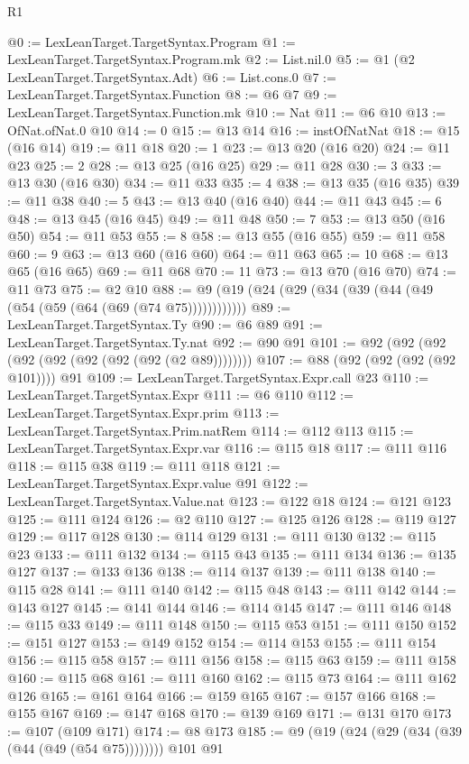 \begin{lexlean}{R1}
\begin{coremodule}
@0 := LexLeanTarget.TargetSyntax.Program
@1 := LexLeanTarget.TargetSyntax.Program.mk
@2 := List.nil.{0}
@5 := @1 (@2 LexLeanTarget.TargetSyntax.Adt)
@6 := List.cons.{0}
@7 := LexLeanTarget.TargetSyntax.Function
@8 := @6 @7
@9 := LexLeanTarget.TargetSyntax.Function.mk
@10 := Nat
@11 := @6 @10
@13 := OfNat.ofNat.{0} @10
@14 := 0
@15 := @13 @14
@16 := instOfNatNat
@18 := @15 (@16 @14)
@19 := @11 @18
@20 := 1
@23 := @13 @20 (@16 @20)
@24 := @11 @23
@25 := 2
@28 := @13 @25 (@16 @25)
@29 := @11 @28
@30 := 3
@33 := @13 @30 (@16 @30)
@34 := @11 @33
@35 := 4
@38 := @13 @35 (@16 @35)
@39 := @11 @38
@40 := 5
@43 := @13 @40 (@16 @40)
@44 := @11 @43
@45 := 6
@48 := @13 @45 (@16 @45)
@49 := @11 @48
@50 := 7
@53 := @13 @50 (@16 @50)
@54 := @11 @53
@55 := 8
@58 := @13 @55 (@16 @55)
@59 := @11 @58
@60 := 9
@63 := @13 @60 (@16 @60)
@64 := @11 @63
@65 := 10
@68 := @13 @65 (@16 @65)
@69 := @11 @68
@70 := 11
@73 := @13 @70 (@16 @70)
@74 := @11 @73
@75 := @2 @10
@88 := @9 (@19 (@24 (@29 (@34 (@39 (@44 (@49 (@54 (@59 (@64 (@69 (@74 @75))))))))))))
@89 := LexLeanTarget.TargetSyntax.Ty
@90 := @6 @89
@91 := LexLeanTarget.TargetSyntax.Ty.nat
@92 := @90 @91
@101 := @92 (@92 (@92 (@92 (@92 (@92 (@92 (@92 (@2 @89))))))))
@107 := @88 (@92 (@92 (@92 (@92 @101)))) @91
@109 := LexLeanTarget.TargetSyntax.Expr.call @23
@110 := LexLeanTarget.TargetSyntax.Expr
@111 := @6 @110
@112 := LexLeanTarget.TargetSyntax.Expr.prim
@113 := LexLeanTarget.TargetSyntax.Prim.natRem
@114 := @112 @113
@115 := LexLeanTarget.TargetSyntax.Expr.var
@116 := @115 @18
@117 := @111 @116
@118 := @115 @38
@119 := @111 @118
@121 := LexLeanTarget.TargetSyntax.Expr.value @91
@122 := LexLeanTarget.TargetSyntax.Value.nat
@123 := @122 @18
@124 := @121 @123
@125 := @111 @124
@126 := @2 @110
@127 := @125 @126
@128 := @119 @127
@129 := @117 @128
@130 := @114 @129
@131 := @111 @130
@132 := @115 @23
@133 := @111 @132
@134 := @115 @43
@135 := @111 @134
@136 := @135 @127
@137 := @133 @136
@138 := @114 @137
@139 := @111 @138
@140 := @115 @28
@141 := @111 @140
@142 := @115 @48
@143 := @111 @142
@144 := @143 @127
@145 := @141 @144
@146 := @114 @145
@147 := @111 @146
@148 := @115 @33
@149 := @111 @148
@150 := @115 @53
@151 := @111 @150
@152 := @151 @127
@153 := @149 @152
@154 := @114 @153
@155 := @111 @154
@156 := @115 @58
@157 := @111 @156
@158 := @115 @63
@159 := @111 @158
@160 := @115 @68
@161 := @111 @160
@162 := @115 @73
@164 := @111 @162 @126
@165 := @161 @164
@166 := @159 @165
@167 := @157 @166
@168 := @155 @167
@169 := @147 @168
@170 := @139 @169
@171 := @131 @170
@173 := @107 (@109 @171)
@174 := @8 @173
@185 := @9 (@19 (@24 (@29 (@34 (@39 (@44 (@49 (@54 @75)))))))) @101 @91

\end{coremodule}
\end{lexlean}

